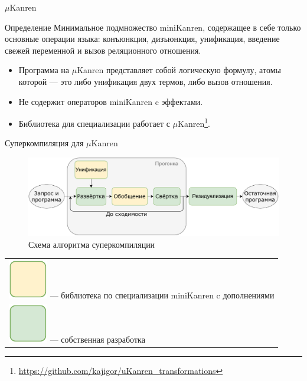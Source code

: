 \documentclass[xcolor=table]{beamer}
\renewcommand{\footnotesize}{\tiny}
\begin{document}
%
%
\begin{frame}{$\mu$Kanren}
\begin{block}{Определение}
Минимальное подмножество miniKanren, содержащее в себе только основные операции языка:
конъюнкция, дизъюнкция,
унификация, введение свежей переменной и вызов реляционного отношения.\\
\end{block}
\begin{itemize}
\item Программа на $\mu$Kanren представляет собой логическую формулу, атомы которой --- это либо унификация двух термов, либо вызов отношения.
\item Не содержит операторов miniKanren c эффектами. 
\item Библиотека для специализации работает с $\mu$Kanren\footnote{\url{https://github.com/kajigor/uKanren_transformations}}.
\end{itemize}

\end{frame}

%
%
\begin{frame}{Суперкомпиляция для $\mu$Kanren}

\begin{figure}[h!]
\center
\includegraphics[scale=0.55]{scompflow.pdf}
\caption{
    Схема алгоритма суперкомпиляции\\
}
\label{fig:scomp}
\end{figure}
{\footnotesize
\begin{tabular}{l}
\includegraphics[scale=0.4]{orange.pdf} --- библиотека по специализации miniKanren c дополнениями\\
\includegraphics[scale=0.4]{green.pdf} --- собственная разработка
\end{tabular}
}


\end{frame}
\end{document}
